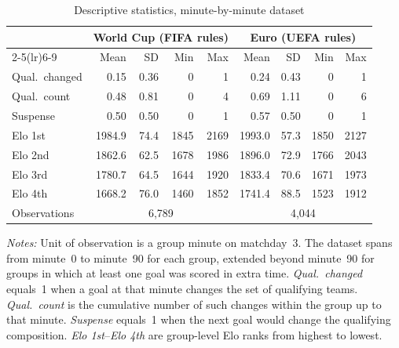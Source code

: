\begin{table}[H]
\centering
\caption{Descriptive statistics, minute-by-minute dataset}
\label{tab:desc_stats_mbm}
\begin{threeparttable}
\begin{tabular}{lrrrrrrrr}
\toprule
 & \multicolumn{4}{c}{World Cup (FIFA rules)} & \multicolumn{4}{c}{Euro (UEFA rules)} \\
\cmidrule(lr){2-5}\cmidrule(lr){6-9}
 & Mean & SD & Min & Max & Mean & SD & Min & Max \\
\midrule
Qual.\ changed  & 0.15 & 0.36 & 0 & 1 & 0.24 & 0.43 & 0 & 1 \\
Qual.\ count    & 0.48 & 0.81 & 0 & 4 & 0.69 & 1.11 & 0 & 6 \\
Suspense        & 0.50 & 0.50 & 0 & 1 & 0.57 & 0.50 & 0 & 1 \\
Elo 1st         & 1984.9 & 74.4 & 1845 & 2169 & 1993.0 & 57.3 & 1850 & 2127 \\
Elo 2nd         & 1862.6 & 62.5 & 1678 & 1986 & 1896.0 & 72.9 & 1766 & 2043 \\
Elo 3rd         & 1780.7 & 64.5 & 1644 & 1920 & 1833.4 & 70.6 & 1671 & 1973 \\
Elo 4th         & 1668.2 & 76.0 & 1460 & 1852 & 1741.4 & 88.5 & 1523 & 1912 \\
\midrule
Observations    & \multicolumn{4}{c}{6{,}789} & \multicolumn{4}{c}{4{,}044} \\
\bottomrule
\end{tabular}
\begin{tablenotes}
\small
\item \textit{Notes:} Unit of observation is a group minute on matchday~3. The dataset spans from minute~0 to minute~90 for each group, extended beyond minute~90 for groups in which at least one goal was scored in extra time. \textit{Qual.\ changed} equals~1 when a goal at that minute changes the set of qualifying teams. \textit{Qual.\ count} is the cumulative number of such changes within the group up to that minute. \textit{Suspense} equals~1 when the next goal would change the qualifying composition. \textit{Elo 1st}--\textit{Elo 4th} are group-level Elo ranks from highest to lowest.
\end{tablenotes}
\end{threeparttable}
\end{table}
